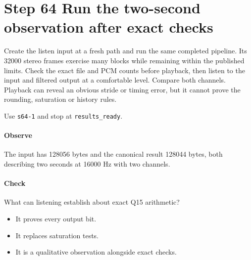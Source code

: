 \section{Step 64 Run the two-second observation after exact checks}\label{pcm-wav-s64}
Create the listen input at a fresh path and run the same completed pipeline. Its 32000 stereo frames exercise many blocks while remaining within the published limits. Check the exact file and PCM counts before playback, then listen to the input and filtered output at a comfortable level. Compare both channels. Playback can reveal an obvious stride or timing error, but it cannot prove the rounding, saturation or history rules.

Use \texttt{s64-1} and stop at \texttt{results\_ready}.

\paragraph{Observe} The input has 128056 bytes and the canonical result 128044 bytes, both describing two seconds at 16000 Hz with two channels.

\paragraph{Check} What can listening establish about exact Q15 arithmetic?
\begin{itemize}
  \item[A.] It proves every output bit.
  \item[B.] It replaces saturation tests.
  \item[C.] It is a qualitative observation alongside exact checks.
\end{itemize}
